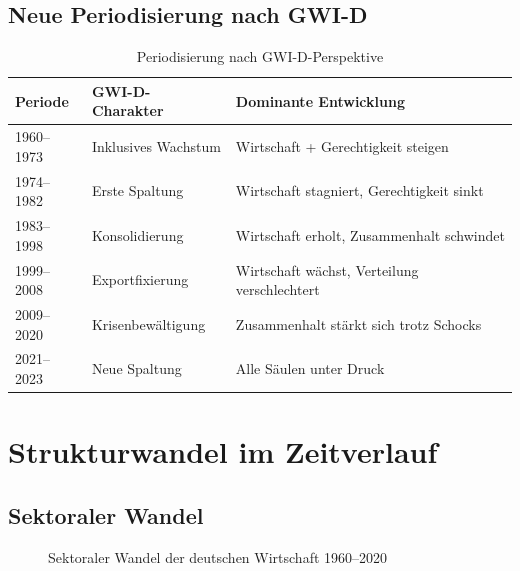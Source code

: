 \subsection{Neue Periodisierung nach GWI-D}
\begin{table}[ht]
\centering
\begin{tabular}{lll}
\toprule
\textbf{Periode} & \textbf{GWI-D-Charakter} & \textbf{Dominante Entwicklung} \\
\midrule
1960--1973 & Inklusives Wachstum & Wirtschaft + Gerechtigkeit steigen \\
1974--1982 & Erste Spaltung & Wirtschaft stagniert, Gerechtigkeit sinkt \\
1983--1998 & Konsolidierung & Wirtschaft erholt, Zusammenhalt schwindet \\
1999--2008 & Exportfixierung & Wirtschaft wächst, Verteilung verschlechtert \\
2009--2020 & Krisenbewältigung & Zusammenhalt stärkt sich trotz Schocks \\
2021--2023 & Neue Spaltung & Alle Säulen unter Druck \\
\bottomrule
\end{tabular}
\caption{Periodisierung nach GWI-D-Perspektive}
\label{tab:periodisierung-gwid}
\end{table}

\section{Strukturwandel im Zeitverlauf}

\subsection{Sektoraler Wandel}
\begin{figure}[ht]
\centering
{}
\caption{Sektoraler Wandel der deutschen Wirtschaft 1960--2020}
\label{fig:sektoraler-wandel}
\end{figure}

